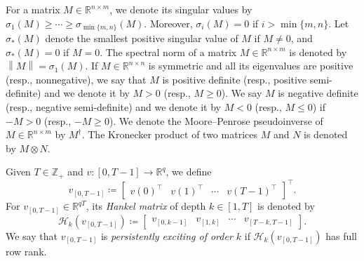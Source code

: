 \documentclass[journal,twoside,web]{ieeecolor}
\newcommand{\norm}[1]{\left\|#1\right\|}
\begin{document}
For a matrix \mbox{$M\in\mathbb{R}^{n\times m}$}, we denote its singular values by \mbox{$\sigma_1(M)\geq\cdots\geq \sigma_{\min\{m,n\}}(M)$}. Moreover, $\sigma_i(M)=0$ if \mbox{$i>\min\{m,n\}$}. Let $\sigma_*(M)$ denote the smallest positive singular value of $M$ if $M\neq 0$, and $\sigma_*(M)=0$ if $M=0$. The spectral norm of a matrix $M\in\mathbb{R}^{n\times m}$ is denoted by $\norm{M}=\sigma_1(M)$. If $M\in\mathbb{R}^{n\times n}$ is symmetric and all its eigenvalues are positive (resp., nonnegative), we say that $M$ is positive definite (resp., positive semi-definite) and we denote it by $M>0$ (resp., $M\geq 0$). We say $M$ is negative definite (resp., negative semi-definite) and we denote it by $M<0$ (resp., $M\leq 0$) if \mbox{$-M>0$} (resp., $-M\geq 0$). We denote the Moore–Penrose pseudoinverse of $M\in\mathbb{R}^{n\times m}$ by $M^\dagger$. The Kronecker product of two matrices $M$ and $N$ is denoted by $M\otimes N$. 

Given $T\in\mathbb{Z}_+$ and $v:[0,T-1]\rightarrow\mathbb{R}^q$, we define
\begin{equation}
v_{[0,T-1]}\coloneqq\begin{bmatrix}
v(0)^\top & v(1)^\top & \cdots & v(T-1)^\top
\end{bmatrix}^\top.
\end{equation}
For $v_{[0,T-1]}\in\mathbb{R}^{qT}$, its \emph{Hankel matrix} of depth $k\in[1,T]$ is denoted by
\begin{equation}
\mathcal{H}_k(v_{[0,T-1]})\coloneqq \begin{bmatrix}
v_{[0,k-1]} & v_{[1,k]} & \cdots & v_{[T-k,T-1]}
\end{bmatrix}.
\end{equation}
We say that $v_{[0,T-1]}$ is \emph{persistently exciting of order $k$} if $\mathcal{H}_k(v_{[0,T-1]})$ has full row rank.%
\end{document}
